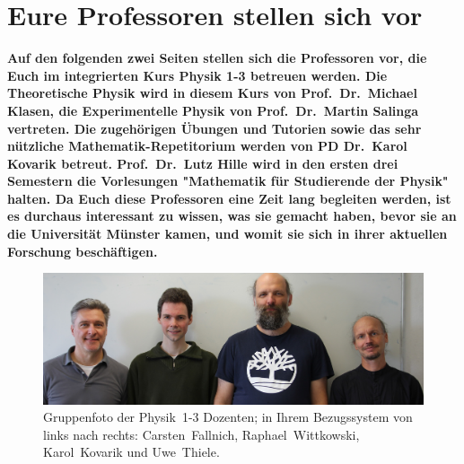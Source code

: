 \section[Eure Profs stellen sich vor]{Eure Professoren stellen sich vor}
\textbf{Auf den folgenden zwei Seiten stellen sich die Professoren vor, die Euch im integrierten Kurs Physik 1-3 betreuen werden. 
Die Theoretische Physik wird in diesem Kurs von Prof.\ Dr.\ Michael Klasen, die Experimentelle Physik von Prof.\ Dr.\ Martin Salinga vertreten. 
Die zugehörigen Übungen und Tutorien sowie das sehr nützliche Mathematik-Repetitorium werden von PD Dr.\ Karol Kovarik betreut. 
Prof.\ Dr.\ Lutz Hille wird in den ersten drei Semestern die Vorlesungen "Mathematik für Studierende der Physik" halten. Da Euch diese Professoren eine Zeit lang begleiten werden, ist es durchaus interessant zu wissen, was sie gemacht haben, bevor sie an die Universität Münster kamen, und womit sie sich in ihrer aktuellen Forschung beschäftigen.}

 \begin{figure}[b] %
	\centering
\includegraphics[width=0.8\columnwidth, height=0.25\textheight]{res/vorstellungsfotos/profs_ws23.jpg}
	\caption*{\centering Gruppenfoto der Physik~1-3 Dozenten; in Ihrem Bezugssystem von links nach rechts: Carsten~Fallnich, Raphael~Wittkowski, Karol~Kovarik und Uwe~Thiele.}
\end{figure}

